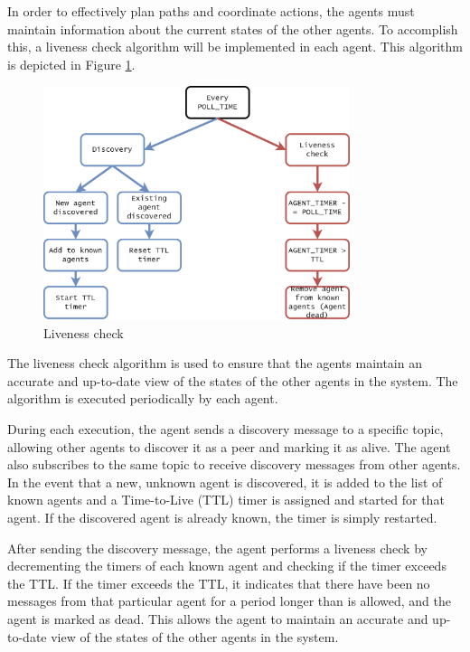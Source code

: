 In order to effectively plan paths and coordinate actions, the agents must maintain information about the current states of the other agents. To accomplish this, a liveness check algorithm will be implemented in each agent. This algorithm is depicted in Figure \ref{fig:liveness_check}.
\begin{figure}[H]
    \centering
    \includegraphics[width=0.8\textwidth]{pictures/agent_ttl.png}
    \caption{Liveness check}
    \label{fig:liveness_check}
\end{figure}

The liveness check algorithm is used to ensure that the agents maintain an accurate and up-to-date view of the states of the other agents in the system. The algorithm is executed periodically by each agent.

During each execution, the agent sends a discovery message to a specific topic, allowing other agents to discover it as a peer and marking it as alive. The agent also subscribes to the same topic to receive discovery messages from other agents. In the event that a new, unknown agent is discovered, it is added to the list of known agents and a Time-to-Live (TTL) timer is assigned and started for that agent. If the discovered agent is already known, the timer is simply restarted.

After sending the discovery message, the agent performs a liveness check by decrementing the timers of each known agent and checking if the timer exceeds the TTL. If the timer exceeds the TTL, it indicates that there have been no messages from that particular agent for a period longer than is allowed, and the agent is marked as dead. This allows the agent to maintain an accurate and up-to-date view of the states of the other agents in the system.
